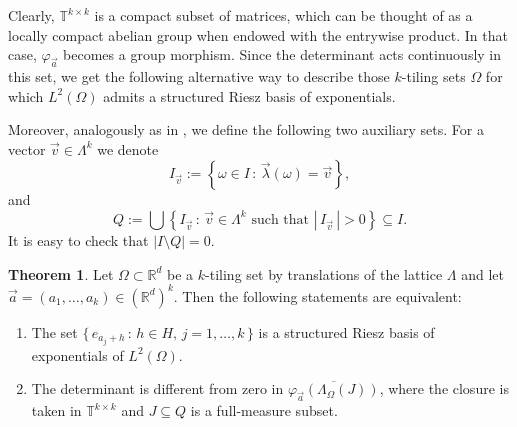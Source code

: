 \documentclass[a4paper,11pt]{amsart}
\theoremstyle{definition}
\newtheorem{teo}[fed]{Theorem}
\theoremstyle{definition}
\def\fii{\varphi }
\def\la{\lambda}
\def\La{\Lambda}
\def\w{\omega}
\def\W{\Omega}
\def\R{\mathbb{R}}
\def\T{\mathbb{T}}
\begin{document}
Clearly, $\T^{k\times k}$ is a compact subset of matrices, which can be thought of as a locally compact abelian group when endowed with the entrywise product. In that case, $\fii_{\vec{a}}$ becomes a group morphism. Since the determinant acts continuously in this set, we get the following alternative way to describe those $k$-tiling sets $\W$ for which $L^2(\W)$ admits a structured Riesz basis of exponentials. 

Moreover, analogously as in \cite{CUC}, we define the following two auxiliary sets. For a vector $\vec{v}\in\La^k$ we denote
$$I_{\vec{v}}:= \left\{ \w\in I \,:\, \vec{\la}(\w) = \vec{v}\right\},$$
and 
$$Q := \bigcup \left\{I_{\vec{v}}\,: \, \vec{v}\in \La^k \text{ such that } |\,I_{\vec{v}}\,|>0\right\}\subseteq I.$$
It is easy to check that $|I\setminus Q|=0$.


\begin{teo}\label{nueva caracterizacion}
	Let $\W\subset\R^d$ be a $k$-tiling set by translations of the lattice $\La$ and let $\vec{a}=(a_1,\dots,a_k)\in(\R^d)^k$. Then the following statements are equivalent: 
	\begin{enumerate}
		\item[i)] The set $\{\,e_{a_j + h}\,:\, h\in H,\, j=1,\dots, k\,\}$ is a structured Riesz basis of exponentials of $L^2(\W)$.
		\item[ii)] The determinant is different from zero in $\overline{\fii_{\vec{a}}(\La_\W(J))}$, where the closure is taken in $\T^{k\times k}$ and $J\subseteq Q$ is a full-measure subset.
	\end{enumerate}
\end{teo}	
\end{document}
